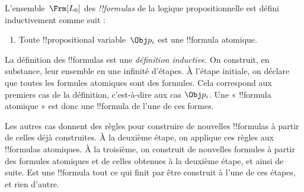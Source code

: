 \documentclass[11pt,a4paper,openany]{memoir}
\begin{document}
\begin{defn}[Formule]
L'ensemble~$\Frm[L_0]$ des \emph{!!{formula}s} de la logique
propositionnelle est défini inductivement comme suit :
\begin{enumerate}


\item Toute !!{propositional variable}~$\Obj p_i$ est une
  !!{formula} atomique.






\end{enumerate}
\end{defn}

\begin{explain}
La définition des !!{formula}s est une \emph{définition inductive}.
On construit, en substance, leur ensemble en une infinité d'étapes.
À l'étape initiale, on déclare que toutes les formules atomiques sont
des formules. Cela correspond aux premiers cas de la définition,
c'est-à-dire aux cas
%
%
$\Obj p_i$. Une « !!{formula} atomique » est donc une !!{formula}
de l'une de ces formes.

Les autres cas donnent des règles pour construire de nouvelles
!!{formula}s à partir de celles déjà construites. À la deuxième étape,
on applique ces règles aux !!{formula}s atomiques. À la troisième,
on construit de nouvelles formules à partir des formules atomiques
et de celles obtenues à la deuxième étape, et ainsi de suite.
Est une !!{formula} tout ce qui finit par être construit à l'une
de ces étapes, et rien d'autre.
\end{explain}
\end{document}
